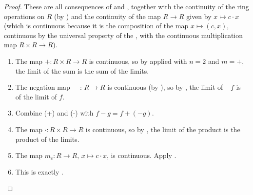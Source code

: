 \begin{proof}
    These are all consequences of  and , together with the continuity of the ring operations on $R$ (by ) and the continuity of the map $R \to R$ given by $x \mapsto c \cdot x$ (which is continuous because it is the composition of the map $x \mapsto (c, x)$, continuous by the universal property of the , with the continuous multiplication map $R \times R \to R$).

    \begin{enumerate}
        \item[(+)] The map $+ : R \times R \to R$ is continuous, so by  applied with $n=2$ and $m = +$, the limit of the sum is the sum of the limits.
        \item[(-)] The negation map $-$ : $R \to R$ is continuous (by ), so by , the limit of $-f$ is $-$ of the limit of $f$.
        \item[(-)] Combine (+) and (-) with $f - g = f + (-g)$.
        \item[($\cdot$)] The map $\cdot : R \times R \to R$ is continuous, so by , the limit of the product is the product of the limits.
        \item[$(c\,\cdot)$] The map $m_c : R \to R$, $x \mapsto c \cdot x$, is continuous. Apply .
        \item[$\circ$] This is exactly .
    \end{enumerate}
\end{proof}
